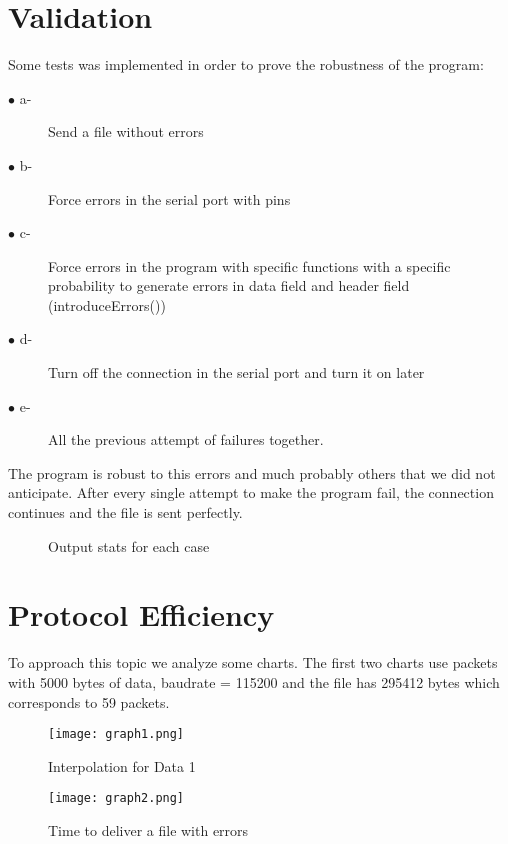 \documentclass[contents.tex]{subfiles}
\begin{document}
\section{Validation} \label{sec:validation}
	Some tests was implemented in order to prove the robustness of the program:
	\begin{description}
		\item[$\bullet$ a-] Send a file without errors
		\item[$\bullet$ b-] Force errors in the serial port with pins
		\item[$\bullet$ c-] Force errors in the program with specific functions with a specific probability to generate errors in data field and header field (introduceErrors())
		\item[$\bullet$ d-] Turn off the connection in the serial port and turn it on later
		\item[$\bullet$ e-] All the previous attempt of failures together.
\end{description}
	The program is robust to this errors and much probably others that we did not anticipate. After every single attempt to make the program fail, the connection continues and the file is sent perfectly.
	\begin{figure}%
		\centering
		\subfloat[]{{\texttt{[image: p=0.png]} }}\hfill
		\hfill
		\subfloat[]{{\texttt{[image: p=20.png]} }}\hfill
		\hfill
		\caption{Output stats for each case}%
		\label{fig:example}%
	\end{figure}

\section{Protocol Efficiency}\label{sec:pefficiency}
To approach this topic we analyze some charts. The first two charts use packets with 5000 bytes of data, baudrate = 115200 and the file has 295412 bytes which corresponds to 59 packets. 
\begin{figure}[!htb]
	\begin{minipage}{0.48\textwidth}
		\centering
		\texttt{[image: graph1.png]}
		\caption{Interpolation for Data 1}\label{Fig:Data1}
	\end{minipage}\hfill
	\begin{minipage}{0.48\textwidth}
		\centering
		\texttt{[image: graph2.png]}
		\caption{Time to deliver a file with errors}\label{Fig:Data2}
	\end{minipage}
\end{figure}
\end{document}
